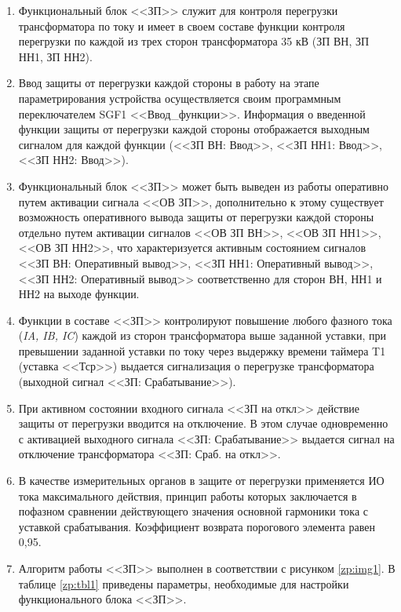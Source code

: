 \documentclass[a4paper, 12pt,table, hidelinks, DIV=calc]{extarticle} %
\begin{document}
\begin{enumerate}[label=\arabic{section}.\arabic{subsection}.\arabic*, labelsep=4pt, leftmargin=0pt, itemindent=57pt]

\item
Функциональный блок <<ЗП>> служит для контроля перегрузки трансформатора по току и имеет в своем составе функции контроля перегрузки по каждой из трех сторон трансформатора 35 кВ (ЗП ВН, ЗП НН1, ЗП НН2). 
\item
Ввод защиты от перегрузки каждой стороны в работу на этапе параметрирования устройства осуществляется своим программным переключателем SGF1 <<Ввод\_функции>>. Информация о введенной функции защиты от перегрузки каждой стороны отображается выходным сигналом для каждой функции (<<ЗП ВН: Ввод>>, <<ЗП НН1: Ввод>>, <<ЗП НН2: Ввод>>).
\item
Функциональный блок <<ЗП>> может быть выведен из работы оперативно путем активации сигнала <<ОВ ЗП>>, дополнительно к этому существует возможность оперативного вывода защиты от перегрузки каждой стороны отдельно путем активации сигналов <<ОВ ЗП ВН>>, <<ОВ ЗП НН1>>, <<ОВ ЗП НН2>>, что характеризуется активным состоянием сигналов <<ЗП ВН: Оперативный вывод>>, <<ЗП НН1: Оперативный вывод>>, <<ЗП НН2: Оперативный вывод>> соответственно для сторон ВН, НН1 и НН2 на выходе функции.
\item\label{zp:punkt1}
Функции в составе <<ЗП>> контролируют повышение любого фазного тока (\textsl{IA, IB, IC}) каждой из сторон трансформатора выше заданной уставки, при превышении заданной уставки по току через выдержку времени таймера T1 (уставка <<Тср>>) выдается сигнализация о перегрузке трансформатора (выходной сигнал <<ЗП: Срабатывание>>). 
\item
При активном состоянии входного сигнала <<ЗП на откл>> действие защиты от перегрузки вводится на отключение. В этом случае одновременно с активацией выходного сигнала <<ЗП: Срабатывание>> выдается сигнал на отключение трансформатора <<ЗП: Сраб. на откл>>.
\item
В качестве измерительных органов в защите от перегрузки применяется ИО тока максимального действия, принцип работы которых заключается в пофазном сравнении действующего значения основной гармоники тока с уставкой срабатывания. Коэффициент возврата порогового элемента равен 0,95.
\item
Алгоритм работы <<ЗП>> выполнен в соответствии с рисунком \ref{zp:img1}. В таблице \ref{zp:tbl1} приведены параметры, необходимые для настройки функционального блока <<ЗП>>.


\end{enumerate}
\end{document}
